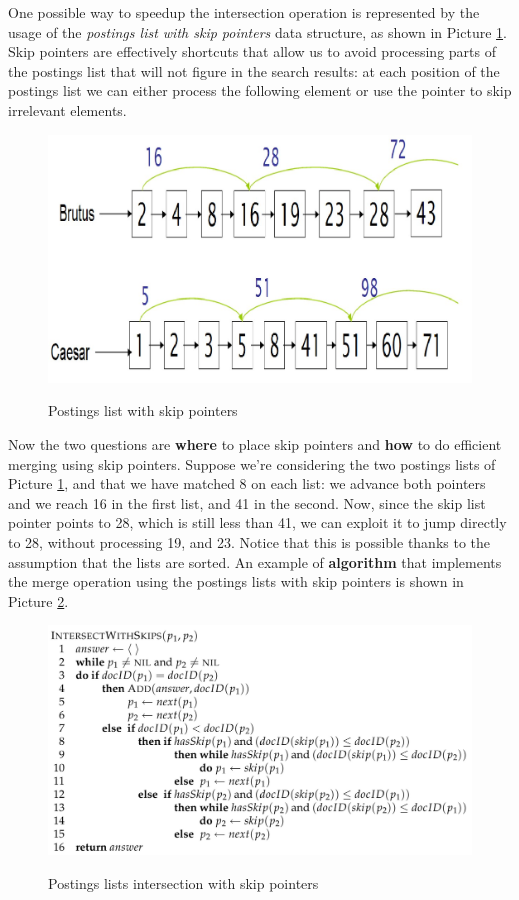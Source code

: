 One possible way to speedup the intersection operation is represented by the usage of the \textit{postings list with skip pointers} data structure, as shown in Picture \ref{postings with skip}. Skip pointers are effectively shortcuts that allow us to avoid processing parts of the postings list that will not figure in the search results: at each position of the postings list we can either process the following element or use the pointer to skip irrelevant elements. 

\begin{figure}[h!]
		\centering
		\includegraphics[scale = 0.5]{img/postings with skip.jpg}
		\label{postings with skip}
        \caption{Postings list with skip pointers}
\end{figure}

Now the two questions are \textbf{where} to place skip pointers and \textbf{how} to do efficient merging using skip pointers. Suppose we're considering the two postings lists of Picture \ref{postings with skip}, and that we have matched 8 on each list: we advance both pointers and we reach 16 in the first list, and 41 in the second. Now, since the skip list pointer points to 28, which is still less than 41, we can exploit it to jump directly to 28, without processing 19, and 23. Notice that this is possible thanks to the assumption that the lists are sorted. An example of \textbf{algorithm} that implements the merge operation using the postings lists with skip pointers is shown in Picture \ref{posting intersection with skip}.

\begin{figure}[h!]
		\centering
		\includegraphics[scale = 0.6]{img/posting intersection with skip.jpg}
		\label{posting intersection with skip}
        \caption{Postings lists intersection with skip pointers}
\end{figure}

